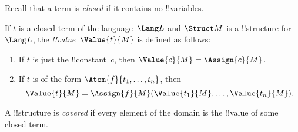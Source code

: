 \documentclass[../../../include/open-logic-section]{subfiles}
\begin{document}


\begin{explain}
Recall that a term is \emph{closed} if it contains no !!{variable}s.
\end{explain}

\begin{defn}
If $t$ is a closed term of the language~$\Lang L$ and $\Struct M$ is a
!!{structure} for~$\Lang L$, the \emph{!!{value}}~$\Value{t}{M}$ is
defined as follows:
\begin{enumerate}
\item If $t$ is just the !!{constant}~$c$, then $\Value{c}{M} = \Assign{c}{M}$.
\item If $t$ is of the form $\Atom{f}{t_1, \ldots, t_n}$, then
  \[
  \Value{t}{M} = \Assign{f}{M}(\Value{t_1}{M}, \ldots,
  \Value{t_n}{M}).
  \]
\end{enumerate}
\end{defn}

\begin{defn}
A !!{structure} is \emph{covered} if every element of the domain is the
!!{value} of some closed term.
\end{defn}
\end{document}
